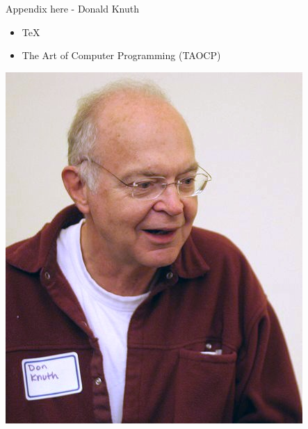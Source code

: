 \documentclass{beamer}
\begin{document}
\begin{CJK*}{UTF8}{bsmi}
    \begin{frame}{Appendix here - Donald Knuth}
        \begin{itemize}
            \item \TeX
            \item The Art of Computer Programming (TAOCP)
        \end{itemize}
        \includegraphics[height=.5\textheight]{Knuth.jpg}
    \end{frame}


\end{CJK*}
\end{document}

